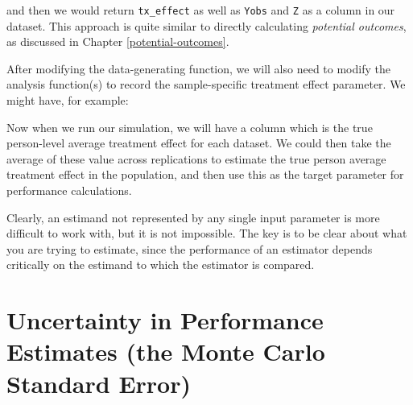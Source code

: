 \documentclass[
]{book}
\newenvironment{Shaded}{\begin{snugshade}}{\end{snugshade}}
\newcommand{\AttributeTok}[1]{\textcolor[rgb]{0.13,0.29,0.53}{#1}}
\newcommand{\ControlFlowTok}[1]{\textcolor[rgb]{0.13,0.29,0.53}{\textbf{#1}}}
\newcommand{\FunctionTok}[1]{\textcolor[rgb]{0.13,0.29,0.53}{\textbf{#1}}}
\newcommand{\NormalTok}[1]{#1}
\newcommand{\OtherTok}[1]{\textcolor[rgb]{0.56,0.35,0.01}{#1}}
\newcommand{\SpecialCharTok}[1]{\textcolor[rgb]{0.81,0.36,0.00}{\textbf{#1}}}
\newcommand{\StringTok}[1]{\textcolor[rgb]{0.31,0.60,0.02}{#1}}
\begin{document}
and then we would return \texttt{tx\_effect} as well as \texttt{Yobs} and \texttt{Z} as a column in our dataset.
This approach is quite similar to directly calculating \emph{potential outcomes}, as discussed in Chapter \ref{potential-outcomes}.

After modifying the data-generating function, we will also need to modify the analysis function(s) to record the sample-specific treatment effect parameter.
We might have, for example:

\begin{Shaded}
\end{Shaded}

Now when we run our simulation, we will have a column which is the true person-level average treatment effect for each dataset.
We could then take the average of these value across replications to estimate the true person average treatment effect in the population, and then use this as the target parameter for performance calculations.

Clearly, an estimand not represented by any single input parameter is more difficult to work with, but it is not impossible.
The key is to be clear about what you are trying to estimate, since the performance of an estimator depends critically on the estimand to which the estimator is compared.

\section{Uncertainty in Performance Estimates (the Monte Carlo Standard Error)}\label{MCSE}
\end{document}
